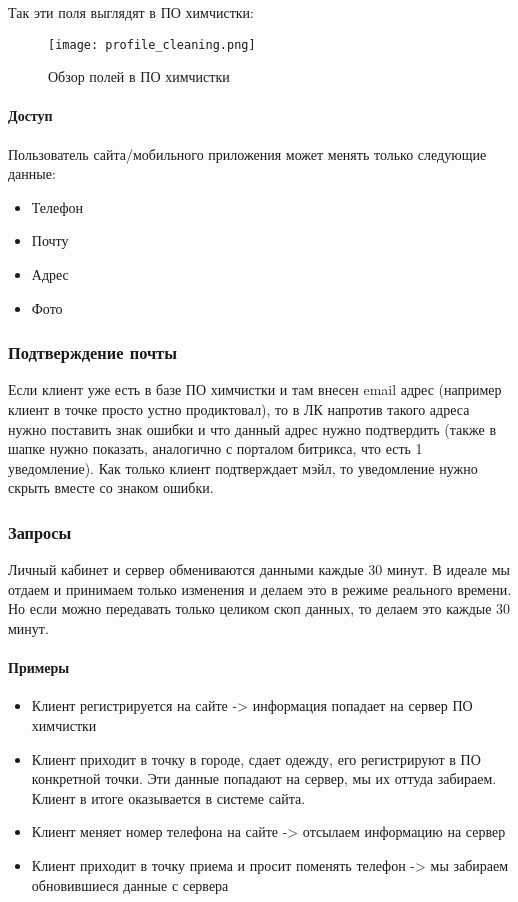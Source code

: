 \documentclass[DIV=calc, paper=a4, fontsize=11pt]{scrartcl} %
\begin{document}
Так эти поля выглядят в ПО химчистки:

	\begin{figure}[H]
        \centering
        \texttt{[image: profile\_cleaning.png]}
        \caption{Обзор полей в ПО химчистки\label{fig:profile_cleaning.png}}
    \end{figure}
    
\paragraph{Доступ}
Пользователь сайта/мобильного приложения может менять только следующие данные:

\begin{itemize}
	\item Телефон
	\item Почту
	\item Адрес
	\item Фото
\end{itemize}

\subsubsection{Подтверждение почты}
Если клиент уже есть в базе ПО химчистки и там внесен email адрес (например клиент в точке просто устно продиктовал), то в ЛК напротив такого адреса нужно поставить знак ошибки и что данный адрес нужно подтвердить (также в шапке нужно показать, аналогично с порталом битрикса, что есть 1 уведомление). Как только клиент подтверждает мэйл, то уведомление нужно скрыть вместе со знаком ошибки.

\subsubsection{Запросы}
Личный кабинет и сервер обмениваются данными каждые 30 минут. В идеале мы отдаем и принимаем только изменения и делаем это в режиме реального времени. Но если можно передавать только целиком скоп данных, то делаем это каждые 30 минут.
\paragraph{Примеры}
\begin{itemize}
	\item Клиент регистрируется на сайте -> информация попадает на сервер ПО химчистки
	\item Клиент приходит в точку в городе, сдает одежду, его регистрируют в ПО конкретной точки. Эти данные попадают на сервер, мы их оттуда забираем. Клиент в итоге оказывается в системе сайта.
	\item Клиент меняет номер телефона на сайте -> отсылаем информацию на сервер
	\item Клиент приходит в точку приема и просит поменять телефон -> мы забираем обновившиеся данные с сервера
\end{itemize}
\end{document}
